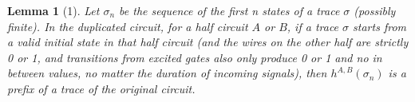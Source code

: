 \documentclass{article}
\newtheorem*{lemma}{Lemma}
\begin{document}
\begin{lemma}[1]
Let $\sigma_n$ be the sequence of the first n states of a trace $\sigma$ (possibly finite).  In the duplicated circuit, for a half circuit $A$ or $B$, if a trace $\sigma$ starts from a valid initial state in that half circuit (and the wires on the other half are strictly 0 or 1, and transitions from excited gates also only produce 0 or 1 and no in between values, no matter the duration of incoming signals), then $h^{A,B}(\sigma_n)$ is a prefix of a trace of the original circuit.


\end{lemma}
\end{document}

